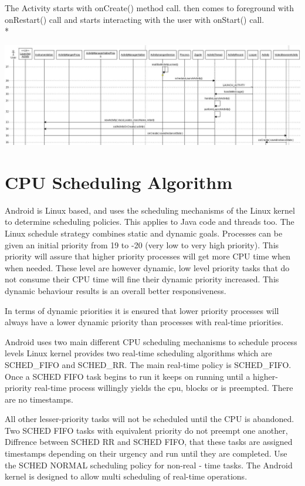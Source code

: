 \documentclass[preprint,12pt]{elsarticle}
\begin{document}
The Activity starts with onCreate() method call. then comes to foreground with onRestart() call and starts interacting with the user with onStart() call.\\*

\includegraphics[scale=0.3]{App_launch_3.jpg}

\section{\large{CPU Scheduling Algorithm}} 

Android is Linux based, and uses the scheduling mechanisms of the Linux kernel to determine scheduling policies. This applies to Java code and threads too. 
The Linux schedule strategy combines static and dynamic goals. Processes can be given an initial priority from 19 to -20 (very low to very high priority). This priority will assure that higher priority processes will get more CPU time when when needed. These level are however dynamic, low level priority tasks that do not consume their CPU time will fine their dynamic priority increased. This dynamic behaviour results is an overall better responsiveness.

In terms of dynamic priorities it is ensured that lower priority processes will always have a lower dynamic priority than processes with real-time priorities.

Android uses two main different CPU scheduling mechanisms to schedule process levels 
Linux kernel provides two real-time scheduling algorithms which are SCHED\_FIFO and SCHED\_RR. The main real-time policy is SCHED\_FIFO. Once a SCHED FIFO task begins to run it keeps on running until a higher-priority real-time process willingly yields the cpu, blocks or is preempted. There are no timestamps. 

All other lesser-priority tasks will not be scheduled until the CPU is abandoned. 
Two SCHED FIFO tasks with equivalent priority do not preempt one another, Diffrence between SCHED RR and SCHED FIFO, that these tasks are assigned timestamps depending on their urgency and run until they are completed. Use the SCHED NORMAL scheduling policy for non-real - time tasks. The  Android kernel is designed to allow multi scheduling of real-time operations.
\end{document}
